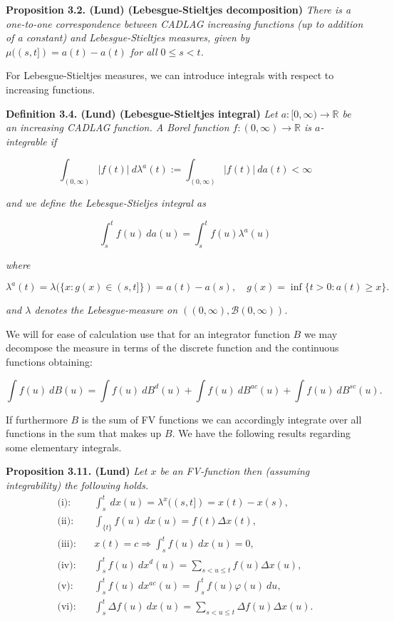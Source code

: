 \documentclass[a4paper,10pt,openany]{book}
\begin{document}
\textbf{Proposition 3.2. (Lund) (Lebesgue-Stieltjes decomposition)} \emph{There is a one-to-one correspondence between CADLAG increasing functions (up to addition of a constant) and Lebesgue-Stieltjes measures, given by \(\mu((s,t])=a(t)-a(t)\) for all \(0\le s< t\).}

For Lebesgue-Stieltjes measures, we can introduce integrals with respect to increasing functions.

\textbf{Definition 3.4. (Lund) (Lebesgue-Stieltjes integral)} \emph{Let \(a : [0,\infty) \to \mathbb R\) be an increasing CADLAG function. A Borel function \(f:(0,\infty)\to\mathbb R\) is \(a\)-integrable if}

\[
\int_{(0,\infty)}\vert f(t)\vert\ d\lambda ^a(t):=\int_{(0,\infty)}\vert f(t)\vert\ da(t)<\infty
\]

\emph{and we define the Lebesque-Stieljes integral as}

\[
\int_s^tf(u)\ da(u)=\int_s^t f(u)\lambda^a(u)
\]

\emph{where}

\[
\lambda^a(t)=\lambda(\{x : g(x)\in (s,t]\})=a(t)-a(s),\quad g(x)=\inf\{t>0 : a(t)\ge x\}.
\]

\emph{and \(\lambda\) denotes the Lebesgue-measure on \(((0,\infty),\mathcal B(0,\infty))\).}

We will for ease of calculation use that for an integrator function \(B\) we may decompose the measure in terms of the discrete function and the continuous functions obtaining:

\[
\int f(u)\ dB(u)=\int f(u)\ dB^d(u)+\int f(u)\ dB^{ac}(u)+\int f(u)\ dB^{sc}(u).
\]

If furthermore \(B\) is the sum of FV functions we can accordingly integrate over all functions in the sum that makes up \(B\). We have the following results regarding some elementary integrals.

\textbf{Proposition 3.11. (Lund)} \emph{Let \(x\) be an FV-function then (assuming integrability) the following holds.}
\begin{align*}
\text{(i):}&\quad\int_s^t\ dx(u)=\lambda^x((s,t])=x(t)-x(s),\\
\text{(ii):}&\quad \int_{\{t\}}f(u)\ dx(u)=f(t)\Delta x(t),\\
\text{(iii):}&\quad x(t)=c\Longrightarrow \int_s^t f(u)\ dx(u)=0,\\
\text{(iv):}&\quad \int_s^t f(u)\ dx^d(u)=\sum_{s< u\le t} f(u)\Delta x(u),\\
\text{(v):}&\quad \int_s^t f(u)\ dx^{ac}(u)=\int_s^t f(u)\varphi(u)\ du,\\
\text{(vi):}&\quad \int_s^t \Delta f(u)\ dx(u)=\sum_{s< u\le t} \Delta f(u)\Delta x(u).
\end{align*}
\end{document}
